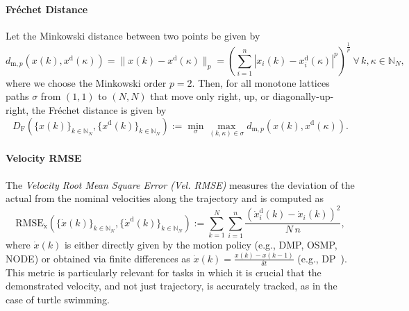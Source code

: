 \paragraph{Fréchet Distance}
Let the Minkowski distance between two points be given by
\begin{equation}
    d_{\mathrm{m},p}(x(k), x^\mathrm{d}(\kappa)) = \lVert x(k) - x^\mathrm{d}(\kappa) \rVert_p = \left ( \sum_{i=1}^n \left | x_i(k) - x_i^\mathrm{d}(\kappa) \right |^p \right )^{\frac{1}{p}} \: \forall \, k, \kappa \in\mathbb{N}_N,
\end{equation}
where we choose the Minkowski order $p = 2$. Then, for all monotone lattices paths $\sigma$ from $(1,1)$ to $(N, N)$ that move only right, up, or diagonally-up-right, the Fréchet distance is given by~\citep{eiter1994computing}
\begin{equation}
    D_\mathrm{F}\left (\{x(k)\}_{k\in\mathbb{N}_N},\{x^{\mathrm d}(k)\}_{k\in\mathbb{N}_N} \right ) := \min_{\sigma} \max_{(k,\kappa) \in \sigma} d_{\mathrm{m},p}(x(k), x^\mathrm{d}(\kappa)).
\end{equation}

\paragraph{Velocity RMSE}
The \emph{Velocity Root Mean Square Error (Vel. \gls{RMSE})} measures the deviation of the actual from the nominal velocities along the trajectory and is computed as
\begin{equation}
    \mathrm{RMSE}_\mathrm{\dot{x}}\left (\{\dot{x}(k)\}_{k\in\mathbb{N}_N},\{\dot{x}^{\mathrm d}(k)\}_{k\in\mathbb{N}_N} \right ) := \sum_{k=1}^{N}  \sum_{i=1}^{n} \frac{\left ( \dot{x}_i^\mathrm{d}(k) - \dot{x}_i(k) \right )^2}{N \, n},
\end{equation}
where $\dot{x}(k)$ is either directly given by the motion policy (e.g., \gls{DMP}, \gls{OSMP}, \gls{NODE}) or obtained via finite differences as $\dot{x}(k) = \frac{x(k) - x(k-1)}{\delta t}$ (e.g., \gls{DP}~\citep{chi2023diffusion}).
This metric is particularly relevant for tasks in which it is crucial that the demonstrated velocity, and not just trajectory, is accurately tracked, as in the case of turtle swimming.

